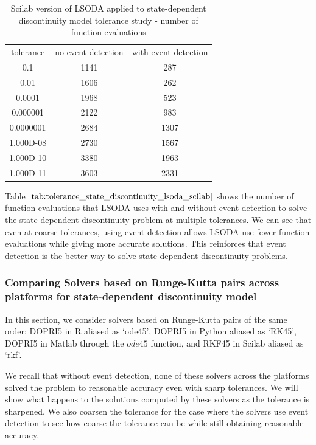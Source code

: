 \begin{table}[h]
\caption {Scilab version of LSODA applied to state-dependent discontinuity model tolerance study - number of function evaluations} \label{tab:tolerance_state_discontinuity_lsoda_scilab} 
\begin{center}
\begin{tabular}{ c c c }
tolerance & no event detection & with event detection \\
0.1 & 1141 & 287 \\
0.01 & 1606 & 262 \\
0.0001 & 1968 & 523 \\
0.000001 & 2122 & 983 \\
0.0000001 & 2684 & 1307 \\
1.000D-08 & 2730 & 1567 \\
1.000D-10 & 3380 & 1963 \\
1.000D-11 & 3603 & 2331 \\
\end{tabular}
\end{center}
\end{table}

Table $\ref{tab:tolerance_state_discontinuity_lsoda_scilab}$ shows the number of function evaluations that LSODA uses with and without event detection to solve the state-dependent discontinuity problem at multiple tolerances. We can see that even at coarse tolerances, using event detection allows LSODA use fewer function evaluations while giving more accurate solutions. This reinforces that event detection is the better way to solve state-dependent discontinuity problems. 

\subsubsection{Comparing Solvers based on Runge-Kutta pairs across platforms for state-dependent discontinuity model}
In this section, we consider solvers based on Runge-Kutta pairs of the same order: DOPRI5 in R aliased as `ode45', DOPRI5 in Python aliased as `RK45', DOPRI5 in Matlab through the $ode45$ function, and RKF45 in Scilab aliased as `rkf'.

We recall that without event detection, none of these solvers across the platforms solved the problem to reasonable accuracy even with sharp tolerances. We will show what happens to the solutions computed by these solvers as the tolerance is sharpened. We also coarsen the tolerance for the case where the solvers use event detection to see how coarse the tolerance can be while still obtaining reasonable accuracy.

